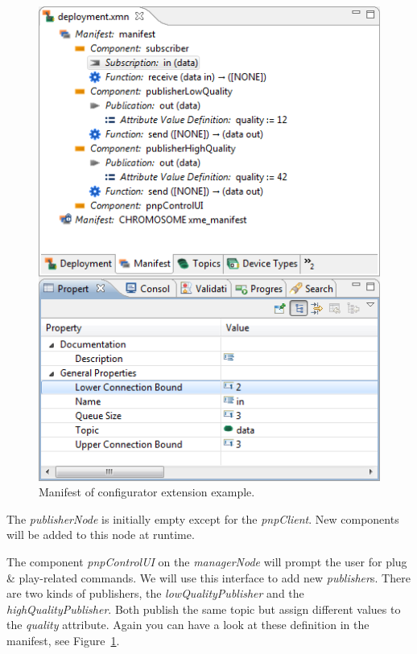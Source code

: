 \begin{figure}[htpb]
	\centering
	\includegraphics[scale=0.8]{figures/example_configuratorExtension_manifest.png}
	\caption{Manifest of configurator extension example.}
	\label{fig:example_configuratorExtension_manifest}
\end{figure}

The \textit{publisherNode} is initially empty except for the \textit{pnpClient}.
New components will be added to this node at runtime.

The component \textit{pnpControlUI} on the \textit{managerNode} will prompt the user
for plug \& play-related commands. We will use this interface to add new \textit{publisher}s.
There are two kinds of publishers, the \textit{lowQualityPublisher} and the \textit{highQualityPublisher}.
Both publish the same topic but assign different values to the \textit{quality} attribute.
Again you can have a look at these definition in the manifest, see Figure~\ref{fig:example_configuratorExtension_manifest}.

